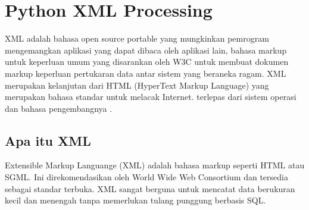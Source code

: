 

\section{Python XML Processing}
  XML adalah bahasa open source portable yang mungkinkan pemrogram mengemangkan aplikasi yang dapat dibaca oleh aplikasi lain, bahasa markup untuk keperluan umum yang disarankan oleh W3C untuk membuat dokumen markup keperluan pertukaran data antar sistem yang beraneka ragam. XML merupakan kelanjutan dari HTML (HyperText Markup Language) yang merupakan bahasa standar untuk melacak Internet.
terlepas dari sistem operasi dan bahasa pengembangnya .
\subsection{Apa itu XML}
  Extensible Markup Languange (XML) adalah bahasa markup seperti HTML atau SGML. 
Ini direkomendasikan oleh World Wide Web Consortium dan tersedia sebagai standar terbuka.
XML sangat berguna untuk mencatat data berukuran kecil dan menengah tanpa memerlukan tulang punggung berbasis SQL. 


